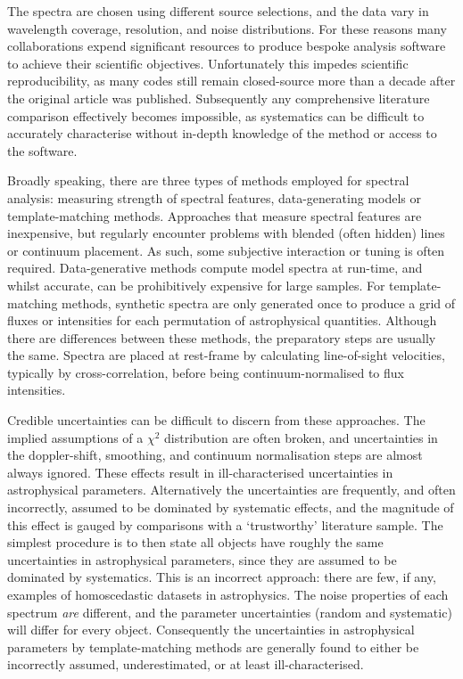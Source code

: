 \documentclass{aastex}
\begin{document}
The spectra are chosen using different source selections, and the data vary in wavelength coverage, resolution, and noise distributions. For these reasons many collaborations expend significant resources to produce bespoke analysis software to achieve their scientific objectives. Unfortunately this impedes scientific reproducibility, as many codes still remain closed-source more than a decade after the original article was published. Subsequently any comprehensive literature comparison effectively becomes impossible, as systematics can be difficult to accurately characterise without in-depth knowledge of the method or access to the software.
 
Broadly speaking, there are three types of methods employed for spectral analysis: measuring strength of spectral features, data-generating models or template-matching methods. Approaches that measure spectral features are inexpensive, but regularly encounter problems with blended (often hidden) lines or continuum placement. As such, some subjective interaction or tuning is often required. Data-generative methods compute model spectra at run-time, and whilst accurate, can be prohibitively expensive for large samples. For template-matching methods, synthetic spectra are only generated once to produce a grid of fluxes or intensities for each permutation of astrophysical quantities. Although there are differences between these methods, the preparatory steps are usually the same. Spectra are placed at rest-frame by calculating line-of-sight velocities, typically by cross-correlation, before being continuum-normalised to flux intensities. 

Credible uncertainties can be difficult to discern from these approaches. The implied assumptions of a $\chi^2$ distribution are often broken, and uncertainties in the doppler-shift, smoothing, and continuum normalisation steps are almost always ignored. These effects result in ill-characterised uncertainties in astrophysical parameters. Alternatively the uncertainties are frequently, and often incorrectly, assumed to be dominated by systematic effects, and the magnitude of this effect is gauged by comparisons with a `trustworthy' literature sample. The simplest procedure is to then state all objects have roughly the same uncertainties in astrophysical parameters, since they are assumed to be dominated by systematics. This is an incorrect approach: there are few, if any, examples of homoscedastic datasets in astrophysics. The noise properties of each spectrum \textit{are} different, and the parameter uncertainties (random and systematic) will differ for every object. Consequently the uncertainties in astrophysical parameters by template-matching methods are generally found to either be incorrectly assumed, underestimated, or at least ill-characterised. 
\end{document}
